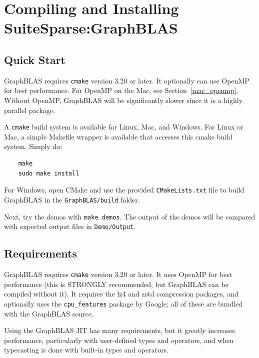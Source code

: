 
\newpage
\section{Compiling and Installing SuiteSparse:GraphBLAS}
\label{sec:install}

\subsection{Quick Start}

GraphBLAS requires \verb'cmake' version 3.20 or later.
It optionally can use OpenMP for best performance.
For OpenMP on the Mac, see Section~\ref{mac_openmp}.
Without OpenMP, GraphBLAS will be significantly slower since it is a highly
parallel package.

A \verb'cmake' build system is available for Linux, Mac, and Windows.
For Linux or Mac, a simple Makefile wrapper is available that accesses this
cmake build system.  Simply do:

    {\small
    \begin{verbatim}
    make
    sudo make install \end{verbatim} }

For Windows, open CMake and use the provided \verb'CMakeLists.txt' file
to build GraphBLAS in the \verb'GraphBLAS/build' folder.

Next, try the demos with \verb'make demos'.
The output of the demos will be compared with expected
output files in \verb'Demo/Output'.

\subsection{Requirements}

GraphBLAS requires \verb'cmake' version 3.20 or later.
It uses OpenMP for best performance (this is STRONGLY
recommended, but GraphBLAS can be compiled without it).
It requires the lz4 and zstd compression packages,
and optionally uses the \verb'cpu_features' package by Google;
all of these are bundled with the GraphBLAS source.

Using the GraphBLAS JIT has many requirements, but it greatly increases
performance, particularly with user-defined types and operators, and when
typecasting is done with built-in types and operators.


